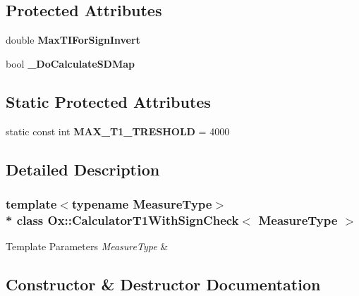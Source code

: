 \subsection*{Protected Attributes}
\begin{DoxyCompactItemize}
\item 
double {\bfseries Max\+T\+I\+For\+Sign\+Invert}\hypertarget{class_ox_1_1_calculator_t1_with_sign_check_afce5bda5ac3751598e6c650943f3b818}{}\label{class_ox_1_1_calculator_t1_with_sign_check_afce5bda5ac3751598e6c650943f3b818}

\item 
bool {\bfseries \+\_\+\+Do\+Calculate\+S\+D\+Map}\hypertarget{class_ox_1_1_calculator_t1_with_sign_check_a876d4995b15f612f15bbdd253c379a2b}{}\label{class_ox_1_1_calculator_t1_with_sign_check_a876d4995b15f612f15bbdd253c379a2b}

\end{DoxyCompactItemize}
\subsection*{Static Protected Attributes}
\begin{DoxyCompactItemize}
\item 
static const int {\bfseries M\+A\+X\+\_\+\+T1\+\_\+\+T\+R\+E\+S\+H\+O\+LD} = 4000\hypertarget{class_ox_1_1_calculator_t1_with_sign_check_a20fbb003a018e0f62707ac306b0c6ac3}{}\label{class_ox_1_1_calculator_t1_with_sign_check_a20fbb003a018e0f62707ac306b0c6ac3}

\end{DoxyCompactItemize}


\subsection{Detailed Description}
\subsubsection*{template$<$typename Measure\+Type$>$\\*
class Ox\+::\+Calculator\+T1\+With\+Sign\+Check$<$ Measure\+Type $>$}


\begin{DoxyTemplParams}{Template Parameters}
{\em Measure\+Type} & \\
\hline
\end{DoxyTemplParams}


\subsection{Constructor \& Destructor Documentation}
